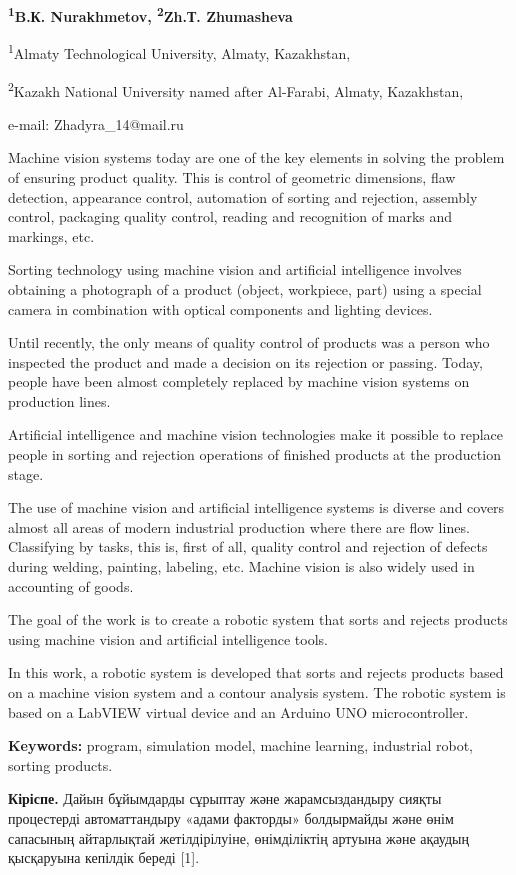 {\bfseries \textsuperscript{1}B.К. Nurakhmetov, \textsuperscript{2}Zh.Т.
Zhumasheva\textsuperscript{\envelope }}

\textsuperscript{1}Almaty Technological University, Almaty, Kazakhstan,

\textsuperscript{2}Kazakh National University named after Al-Farabi,
Almaty, Kazakhstan,

e-mail: Zhadyra\_14@mail.ru

Machine vision systems today are one of the key elements in solving the
problem of ensuring product quality. This is control of geometric
dimensions, flaw detection, appearance control, automation of sorting
and rejection, assembly control, packaging quality control, reading and
recognition of marks and markings, etc.

Sorting technology using machine vision and artificial intelligence
involves obtaining a photograph of a product (object, workpiece, part)
using a special camera in combination with optical components and
lighting devices.

Until recently, the only means of quality control of products was a
person who inspected the product and made a decision on its rejection or
passing. Today, people have been almost completely replaced by machine
vision systems on production lines.

Artificial intelligence and machine vision technologies make it possible
to replace people in sorting and rejection operations of finished
products at the production stage.

The use of machine vision and artificial intelligence systems is diverse
and covers almost all areas of modern industrial production where there
are flow lines. Classifying by tasks, this is, first of all, quality
control and rejection of defects during welding, painting, labeling,
etc. Machine vision is also widely used in accounting of goods.

The goal of the work is to create a robotic system that sorts and
rejects products using machine vision and artificial intelligence tools.

In this work, a robotic system is developed that sorts and rejects
products based on a machine vision system and a contour analysis system.
The robotic system is based on a LabVIEW virtual device and an Arduino
UNO microcontroller.

{\bfseries Keywords:} program, simulation model, machine learning,
industrial robot, sorting products.

{\bfseries Кіріспе.} Дайын бұйымдарды сұрыптау және жарамсыздандыру сияқты
процестерді автоматтандыру «адами факторды» болдырмайды және өнім
сапасының айтарлықтай жетілдірілуіне, өнімділіктің артуына және ақаудың
қысқаруына кепілдік береді {[}1{]}.

